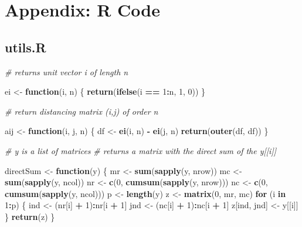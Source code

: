 \documentclass[
  12pt,
]{article}
\newenvironment{Shaded}{\begin{snugshade}}{\end{snugshade}}
\newcommand{\CommentTok}[1]{\textcolor[rgb]{0.56,0.35,0.01}{\textit{#1}}}
\newcommand{\ControlFlowTok}[1]{\textcolor[rgb]{0.13,0.29,0.53}{\textbf{#1}}}
\newcommand{\DecValTok}[1]{\textcolor[rgb]{0.00,0.00,0.81}{#1}}
\newcommand{\FunctionTok}[1]{\textcolor[rgb]{0.13,0.29,0.53}{\textbf{#1}}}
\newcommand{\NormalTok}[1]{#1}
\newcommand{\OtherTok}[1]{\textcolor[rgb]{0.56,0.35,0.01}{#1}}
\newcommand{\SpecialCharTok}[1]{\textcolor[rgb]{0.81,0.36,0.00}{\textbf{#1}}}
\begin{document}
\section{Appendix: R Code}\label{appendix-r-code}

\subsection{utils.R}\label{utils.r}

\begin{Shaded}
\begin{Highlighting}[]
\CommentTok{\# returns unit vector i of length n}

\NormalTok{ei }\OtherTok{\textless{}{-}} \ControlFlowTok{function}\NormalTok{(i, n) \{}
  \FunctionTok{return}\NormalTok{(}\FunctionTok{ifelse}\NormalTok{(i }\SpecialCharTok{==} \DecValTok{1}\SpecialCharTok{:}\NormalTok{n, }\DecValTok{1}\NormalTok{, }\DecValTok{0}\NormalTok{))}
\NormalTok{\}}

\CommentTok{\# return distancing matrix (i,j) of order n}

\NormalTok{aij }\OtherTok{\textless{}{-}} \ControlFlowTok{function}\NormalTok{(i, j, n) \{}
\NormalTok{  df }\OtherTok{\textless{}{-}} \FunctionTok{ei}\NormalTok{(i, n) }\SpecialCharTok{{-}} \FunctionTok{ei}\NormalTok{(j, n)}
  \FunctionTok{return}\NormalTok{(}\FunctionTok{outer}\NormalTok{(df, df))}
\NormalTok{\}}

\CommentTok{\# y is a list of matrices}
\CommentTok{\# returns a matrix with the direct sum of the y[[i]]}

\NormalTok{directSum }\OtherTok{\textless{}{-}} \ControlFlowTok{function}\NormalTok{(y) \{}
\NormalTok{  mr }\OtherTok{\textless{}{-}} \FunctionTok{sum}\NormalTok{(}\FunctionTok{sapply}\NormalTok{(y, nrow))}
\NormalTok{  mc }\OtherTok{\textless{}{-}} \FunctionTok{sum}\NormalTok{(}\FunctionTok{sapply}\NormalTok{(y, ncol))}
\NormalTok{  nr }\OtherTok{\textless{}{-}} \FunctionTok{c}\NormalTok{(}\DecValTok{0}\NormalTok{, }\FunctionTok{cumsum}\NormalTok{(}\FunctionTok{sapply}\NormalTok{(y, nrow)))}
\NormalTok{  nc }\OtherTok{\textless{}{-}} \FunctionTok{c}\NormalTok{(}\DecValTok{0}\NormalTok{, }\FunctionTok{cumsum}\NormalTok{(}\FunctionTok{sapply}\NormalTok{(y, ncol)))}
\NormalTok{  p }\OtherTok{\textless{}{-}} \FunctionTok{length}\NormalTok{(y)}
\NormalTok{  z }\OtherTok{\textless{}{-}} \FunctionTok{matrix}\NormalTok{(}\DecValTok{0}\NormalTok{, mr, mc)}
  \ControlFlowTok{for}\NormalTok{ (i }\ControlFlowTok{in} \DecValTok{1}\SpecialCharTok{:}\NormalTok{p) \{}
\NormalTok{    ind }\OtherTok{\textless{}{-}}\NormalTok{ (nr[i] }\SpecialCharTok{+} \DecValTok{1}\NormalTok{)}\SpecialCharTok{:}\NormalTok{nr[i }\SpecialCharTok{+} \DecValTok{1}\NormalTok{]}
\NormalTok{    jnd }\OtherTok{\textless{}{-}}\NormalTok{ (nc[i] }\SpecialCharTok{+} \DecValTok{1}\NormalTok{)}\SpecialCharTok{:}\NormalTok{nc[i }\SpecialCharTok{+} \DecValTok{1}\NormalTok{]}
\NormalTok{    z[ind, jnd] }\OtherTok{\textless{}{-}}\NormalTok{ y[[i]]}
\NormalTok{  \}}
  \FunctionTok{return}\NormalTok{(z)}
\NormalTok{\}}


\end{Highlighting}
\end{Shaded}
\end{document}
